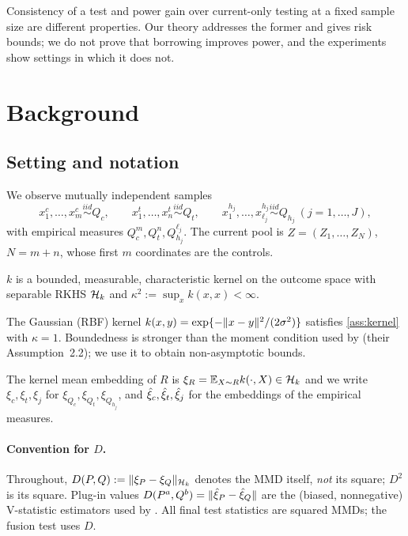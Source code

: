 \documentclass[11pt,a4paper]{article}
\begin{document}
Consistency of a test and power gain over current-only testing at a fixed sample size are different properties. Our theory addresses the former and gives risk bounds; we do not prove that borrowing improves power, and the experiments show settings in which it does not.

\section{Background}\label{sec:background}

\subsection{Setting and notation}\label{sec:setting}

We observe mutually independent samples
\[
x^c_1,\dots,x^c_m\overset{iid}{\sim}Q_c,\qquad x^t_1,\dots,x^t_n\overset{iid}{\sim}Q_t,\qquad x^{h_j}_1,\dots,x^{h_j}_{\ell_j}\overset{iid}{\sim}Q_{h_j}\ (j=1,\dots,J),
\]
with empirical measures $Q_c^m,Q_t^n,Q_{h_j}^{\ell_j}$. The current pool is $Z=(Z_1,\dots,Z_N)$, $N=m+n$, whose first $m$ coordinates are the controls.

\begin{assumption}[Kernel]\label{ass:kernel}
$k$ is a bounded, measurable, characteristic kernel on the outcome space with separable RKHS $\mathcal{H}_k$ and $\kappa^2:=\sup_x k(x,x)<\infty$.
\end{assumption}

The Gaussian (RBF) kernel $k(x,y)=\exp\{-\lVert x-y\rVert^2/(2\sigma^2)\}$ satisfies \cref{ass:kernel} with $\kappa=1$. Boundedness is stronger than the moment condition used by \citet{yang2026} (their Assumption~2.2); we use it to obtain non-asymptotic bounds.

The kernel mean embedding of $R$ is $\xi_R=\mathbb{E}_{X\sim R}k(\cdot,X)\in\mathcal{H}_k$ and we write $\xi_c,\xi_t,\xi_j$ for $\xi_{Q_c},\xi_{Q_t},\xi_{Q_{h_j}}$, and $\hat\xi_c,\hat\xi_t,\hat\xi_j$ for the embeddings of the empirical measures.

\paragraph{Convention for $D$.} Throughout, $D(P,Q):=\lVert \xi_P-\xi_Q\rVert_{\mathcal{H}_k}$ denotes the MMD itself, \emph{not} its square; $D^2$ is its square. Plug-in values $D(P^a,Q^b)=\lVert \hat\xi_P-\hat\xi_Q\rVert$ are the (biased, nonnegative) V-statistic estimators used by \citet{yang2026}. All final test statistics are squared MMDs; the fusion test uses $D$.
\end{document}
